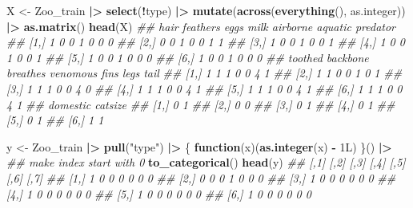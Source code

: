 \documentclass[
  notitlepage]{book}
\newenvironment{Shaded}{\begin{snugshade}}{\end{snugshade}}
\newcommand{\CommentTok}[1]{\textcolor[rgb]{0.56,0.35,0.01}{\textit{#1}}}
\newcommand{\ControlFlowTok}[1]{\textcolor[rgb]{0.13,0.29,0.53}{\textbf{#1}}}
\newcommand{\ErrorTok}[1]{\textcolor[rgb]{0.64,0.00,0.00}{\textbf{#1}}}
\newcommand{\KeywordTok}[1]{\textcolor[rgb]{0.13,0.29,0.53}{\textbf{#1}}}
\newcommand{\NormalTok}[1]{#1}
\newcommand{\OperatorTok}[1]{\textcolor[rgb]{0.81,0.36,0.00}{\textbf{#1}}}
\newcommand{\StringTok}[1]{\textcolor[rgb]{0.31,0.60,0.02}{#1}}
\begin{document}
\begin{Shaded}
\begin{Highlighting}[]
\NormalTok{X \textless{}{-}}\StringTok{ }\NormalTok{Zoo\_train }\OperatorTok{|}\ErrorTok{\textgreater{}}\StringTok{ }
\StringTok{  }\KeywordTok{select}\NormalTok{(}\OperatorTok{!}\NormalTok{type) }\OperatorTok{|}\ErrorTok{\textgreater{}}\StringTok{ }
\StringTok{  }\KeywordTok{mutate}\NormalTok{(}\KeywordTok{across}\NormalTok{(}\KeywordTok{everything}\NormalTok{(), as.integer)) }\OperatorTok{|}\ErrorTok{\textgreater{}}\StringTok{ }
\StringTok{  }\KeywordTok{as.matrix}\NormalTok{()}
\KeywordTok{head}\NormalTok{(X)}
\CommentTok{\#\#      hair feathers eggs milk airborne aquatic predator}
\CommentTok{\#\# [1,]    1        0    0    1        0       0        0}
\CommentTok{\#\# [2,]    0        0    1    0        0       1        1}
\CommentTok{\#\# [3,]    1        0    0    1        0       0        1}
\CommentTok{\#\# [4,]    1        0    0    1        0       0        1}
\CommentTok{\#\# [5,]    1        0    0    1        0       0        0}
\CommentTok{\#\# [6,]    1        0    0    1        0       0        0}
\CommentTok{\#\#      toothed backbone breathes venomous fins legs tail}
\CommentTok{\#\# [1,]       1        1        1        0    0    4    1}
\CommentTok{\#\# [2,]       1        1        0        0    1    0    1}
\CommentTok{\#\# [3,]       1        1        1        0    0    4    0}
\CommentTok{\#\# [4,]       1        1        1        0    0    4    1}
\CommentTok{\#\# [5,]       1        1        1        0    0    4    1}
\CommentTok{\#\# [6,]       1        1        1        0    0    4    1}
\CommentTok{\#\#      domestic catsize}
\CommentTok{\#\# [1,]        0       1}
\CommentTok{\#\# [2,]        0       0}
\CommentTok{\#\# [3,]        0       1}
\CommentTok{\#\# [4,]        0       1}
\CommentTok{\#\# [5,]        0       1}
\CommentTok{\#\# [6,]        1       1}
\end{Highlighting}
\end{Shaded}

\begin{Shaded}
\begin{Highlighting}[]
\NormalTok{y \textless{}{-}}\StringTok{ }\NormalTok{Zoo\_train }\OperatorTok{|}\ErrorTok{\textgreater{}}\StringTok{ }
\StringTok{  }\KeywordTok{pull}\NormalTok{(}\StringTok{"type"}\NormalTok{) }\OperatorTok{|}\ErrorTok{\textgreater{}}\StringTok{ }
\StringTok{  }\NormalTok{\{ }\ControlFlowTok{function}\NormalTok{(x)(}\KeywordTok{as.integer}\NormalTok{(x) }\OperatorTok{{-}}\StringTok{ }\NormalTok{1L) \}() }\OperatorTok{|}\ErrorTok{\textgreater{}}\StringTok{   }\CommentTok{\#\# make index start with 0}
\StringTok{  }\KeywordTok{to\_categorical}\NormalTok{()}
\KeywordTok{head}\NormalTok{(y)}
\CommentTok{\#\#      [,1] [,2] [,3] [,4] [,5] [,6] [,7]}
\CommentTok{\#\# [1,]    1    0    0    0    0    0    0}
\CommentTok{\#\# [2,]    0    0    0    1    0    0    0}
\CommentTok{\#\# [3,]    1    0    0    0    0    0    0}
\CommentTok{\#\# [4,]    1    0    0    0    0    0    0}
\CommentTok{\#\# [5,]    1    0    0    0    0    0    0}
\CommentTok{\#\# [6,]    1    0    0    0    0    0    0}
\end{Highlighting}
\end{Shaded}
\end{document}
